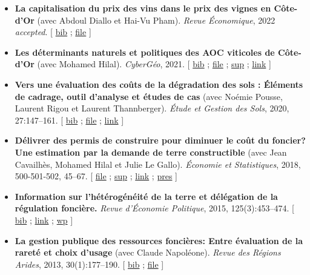\documentclass[11pt, a4paper]{./style}
\begin{document}
\begin{itemize}
\item \textbf{La capitalisation du prix des vins dans le prix des vignes en
Côte-d’Or} (avec Abdoul Diallo et Hai-Vu Pham). \emph{Revue
Économique}, 2022 \emph{accepted}. [ \href{bib/DNPA.bib}{bib} ; \href{doc/VINPX-FILE.pdf}{file} ]
\item \textbf{Les déterminants naturels et politiques des AOC viticoles de
Côte-d’Or} (avec Mohamed Hilal). \emph{CyberGéo}, 2021. [ \href{bib/DNPA.bib}{bib} ; \href{doc/DNPA-FILE.pdf}{file} ;
\href{doc/DNPA-SUP.pdf}{sup} ; \href{https://journals.openedition.org/cybergeo/36443}{link} ]
\item \textbf{Vers une évaluation des coûts de la dégradation des sols :
Éléments de cadrage, outil d'analyse et études de cas} (avec
Noémie Pousse, Laurent Rigou et Laurent Thannberger). \emph{Étude et
Gestion des Sols}, 2020, 27:147--161. [ \href{bib/GPRF.bib}{bib} ; \href{doc/ECOSOL-FILE.pdf}{file} ; \href{https://www.afes.fr/publications/revue-etude-et-gestion-des-sols/volume-27-numero-1/}{link} ]
\item \textbf{Délivrer des permis de construire pour diminuer le coût du
foncier? Une estimation par la demande de terre constructible}
(avec Jean Cavailhès, Mohamed Hilal et Julie Le Gallo).
\emph{Économie et Statistiques}, 2018, 500-501-502, 45--67. [ \href{doc/PCPXf-FILE.pdf}{file} ;
\href{doc/PCPX-SUP.pdf}{sup} ; \href{https://insee.fr/fr/statistiques/3621977?sommaire=3622116}{link} ; \href{doc/PCPXf-PRES.pdf}{pres} ]
\item \textbf{Information sur l'hétérogénéité de la terre et délégation de la
régulation foncière.} \emph{Revue d'Économie Politique}, 2015,
125(3):453--474. [ \href{bib/IFHT.bib}{bib} ; \href{https://www.cairn.info/revue-d-economie-politique-2015-3-page-453.htm}{link} ; \href{http://ideas.repec.org/p/ceo/wpaper/32.html}{wp} ]
\item \textbf{La gestion publique des ressources foncières: Entre évaluation
de la rareté et choix d'usage} (avec Claude Napoléone). \emph{Revue
des Régions Arides}, 2013, 30(1):177--190. [ \href{bib/GPRF.bib}{bib} ; \href{https://www.researchgate.net/profile/Claude\_Napoleone/publication/268075060\_La\_gestion\_publique\_des\_ressources\_foncieres\_entre\_evaluation\_de\_la\_rarete\_et\_choix\_d'usages/links/5460bdd20cf295b5616376de/La-gestion-publique-des-ressources-foncieres-entre-evaluation-de-la-rarete-et-choix-dusages.pdf}{file} ]
\end{itemize}
\end{document}
